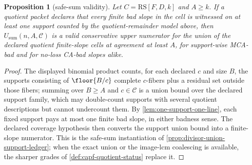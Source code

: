 \documentclass[11pt]{article}
\newtheorem{proposition}[proposition]{Proposition}
\theoremstyle{definition}
\theoremstyle{remark}
\newcommand{\RS}{\mathrm{RS}}
\begin{document}
\begin{proposition}[safe-sum validity]\label{prop:capf-quotient-safe-sum}
Let $C=\RS[F,D,k]$ and $A\ge k$.  If a quotient packet declares that every finite bad slope in the cell is witnessed on at least one support counted by the quotient-remainder model above, then $U_{\mathrm{sum}}(n,A,\mathcal C)$ is a valid conservative upper numerator for the union of the declared quotient finite-slope cells at agreement at least $A$, for support-wise MCA-bad and for no-loss CA-bad slopes alike.
\end{proposition}

\begin{proof}
The displayed binomial product counts, for each declared $c$ and size $B$, the supports consisting of $\floor{B/c}$ complete $c$-fibers plus a residual set outside those fibers; summing over $B\ge A$ and $c\in\mathcal C$ is a union bound over the declared support family, which may double-count supports with several quotient descriptions but cannot undercount them.  By \cref{lem:one-support-one-line}, each fixed support pays at most one finite bad slope, in either badness sense.  The declared coverage hypothesis then converts the support union bound into a finite-slope numerator.  This is the safe-sum instantiation of \cref{prop:divisor-union-support-ledger}; when the exact union or the image-lcm coalescing is available, the sharper grades of \cref{def:capf-quotient-status} replace it.
\end{proof}
\end{document}

